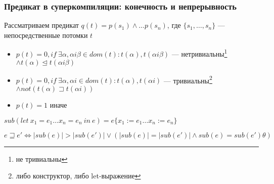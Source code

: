 \documentclass{beamer}
\def\iff{\Leftrightarrow}
\begin{document}
\begin{frame}[fragile]
  \transwipe[direction=90]
  \frametitle{Предикат в суперкомпиляции: конечность и непрерывность}

Рассматриваем предикат $q(t) = p(s_1) \wedge \dots p(s_n)$, где  $\{ s_1, \dots, s_n \}$ --- непосредственные потомки $t$

\begin{itemize}
  \item $p(t) = 0, if \ \exists \alpha, \alpha i \beta \in dom(t): t(\alpha), t(\alpha i \beta)$ --- нетривиальны\footnote{не тривиальны} $\wedge t(\alpha) \trianglelefteq t(\alpha i \beta )$
  \item $p(t) = 0, if \ \exists \alpha, \alpha i \in dom(t): t(\alpha), t(\alpha i)$ --- тривиальны\footnote{либо конструктор, либо let-выражение} $\wedge not (t(\alpha) \sqsupset t(\alpha i))$
  \item $p(t) = 1$ иначе 
\end{itemize}

\vfill 

$sub(let \ x_1 = e_1 \dots x_n = e_n \ in \ e) = e\{x_1 := e_1 \dots x_n := e_n \}$

\vfill 

$e \sqsupseteq e' \iff |sub(e)| > |sub(e')| \vee (|sub(e)| = |sub(e')| \wedge sub(e) = sub(e') \theta)$

\end{frame}
\end{document}
